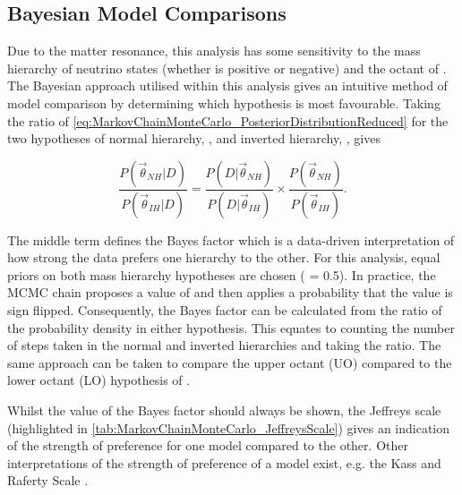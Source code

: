 \subsection{Bayesian Model Comparisons}
\label{sec:MarkovChainMonteCarlo_BayesTheorem}
Due to the matter resonance, this analysis has some sensitivity to the mass hierarchy of neutrino states (whether \delmsqatm is positive or negative) and the octant of \sinsqatm. The Bayesian approach utilised within this analysis gives an intuitive method of model comparison by determining which hypothesis is most favourable. Taking the ratio of \autoref{eq:MarkovChainMonteCarlo_PosteriorDistributionReduced} for the two hypotheses of normal hierarchy, , and inverted hierarchy, , gives

\begin{equation}
  \frac{P(\vec{\theta}_{NH}|D)}{P(\vec{\theta}_{IH}|D)} = \frac{P(D|\vec{\theta}_{NH})}{P(D|\vec{\theta}_{IH})} \times \frac{P(\vec{\theta}_{NH})}{P(\vec{\theta}_{IH})}.
\end{equation}

The middle term defines the Bayes factor which is a data-driven interpretation of how strong the data prefers one hierarchy to the other. For this analysis, equal priors on both mass hierarchy hypotheses are chosen ( = 0.5). In practice, the MCMC chain proposes a value of \quickmath{|}\delmsqatm\quickmath{|} and then applies a  probability that the value is sign flipped. Consequently, the Bayes factor can be calculated from the ratio of the probability density in either hypothesis. This equates to counting the number of steps taken in the normal and inverted hierarchies and taking the ratio. The same approach can be taken to compare the upper octant (UO) compared to the lower octant (LO) hypothesis of \sinsqatm.

Whilst the value of the Bayes factor should always be shown, the Jeffreys scale \cite{Jeffreys:1939xee} (highlighted in \autoref{tab:MarkovChainMonteCarlo_JeffreysScale}) gives an indication of the strength of preference for one model compared to the other. Other interpretations of the strength of preference of a model exist, e.g. the Kass and Raferty Scale \cite{Kass1995-nl}.

